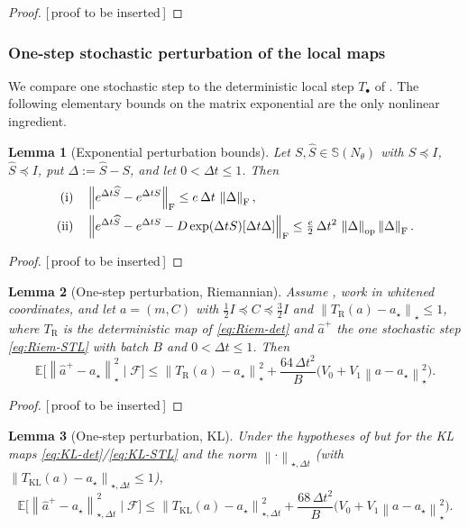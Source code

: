 \documentclass[11pt]{article}
\theoremstyle{plain}
\newtheorem{lemma}[lemma]{Lemma}
\theoremstyle{definition}
\theoremstyle{remark}
\newcommand{\E}{\mathbb{E}}
\newcommand{\KL}{\mathrm{KL}}
\newcommand{\Sym}{\mathbb{S}}
\newcommand{\Id}{I}
\newcommand{\op}{\mathrm{op}}
\newcommand{\Frob}{\mathrm{F}}
\newcommand{\Riem}{\mathrm{R}}
\newcommand{\Fil}{\mathcal{F}}
\newcommand{\norm}[1]{\left\lVert #1\right\rVert}
\newcommand{\PROOFHOLE}{{\color{red}\textsf{[\,proof to be inserted\,]}}}
\begin{document}
\begin{proof}
\PROOFHOLE
\end{proof}

\subsubsection{One-step stochastic perturbation of the local maps}
\label{subsec:local-perturb}

We compare one stochastic step to the deterministic local step $T_\bullet$ of .
The following elementary bounds on the matrix exponential are the only nonlinear ingredient.

\begin{lemma}[Exponential perturbation bounds]
\label{lem:exp-perturb}
Let $S,\widehat S\in\Sym(N_\theta)$ with $S\preceq\Id$, $\widehat S\preceq\Id$, put
$\Delta:=\widehat S-S$, and let $0<\Delta t\leq1$. Then
\begin{align*}
\textup{(i)}\quad & \norm{e^{\Delta t\widehat S}-e^{\Delta tS}}_{\Frob}\leq e\,\Delta t\,\norm{\Delta}_{\Frob},\\
\textup{(ii)}\quad & \norm{e^{\Delta t\widehat S}-e^{\Delta tS}-D\exp(\Delta tS)[\Delta t\Delta]}_{\Frob}
\leq\tfrac{e}{2}\,\Delta t^2\,\norm{\Delta}_{\op}\norm{\Delta}_{\Frob}.
\end{align*}
\end{lemma}

\begin{proof}
\PROOFHOLE
\end{proof}

\begin{lemma}[One-step perturbation, Riemannian]
\label{lem:local-perturb-Riem}
Assume , work in whitened coordinates, and let
$a=(m,C)$ with $\tfrac12\Id\preceq C\preceq\tfrac32\Id$ and $\norm{T_{\Riem}(a)-a_\star}_\star\leq1$,
where $T_{\Riem}$ is the deterministic map of \eqref{eq:Riem-det} and $\widehat a^+$ the one stochastic
step \eqref{eq:Riem-STL} with batch $B$ and $0<\Delta t\leq1$. Then
\[
    \E\bigl[\norm{\widehat a^+-a_\star}_\star^2\mid\Fil\bigr]
    \leq\norm{T_{\Riem}(a)-a_\star}_\star^2+\frac{64\,\Delta t^2}{B}\bigl(V_0+V_1\norm{a-a_\star}_\star^2\bigr).
\]
\end{lemma}

\begin{proof}
\PROOFHOLE
\end{proof}

\begin{lemma}[One-step perturbation, KL]
\label{lem:local-perturb-KL}
Under the hypotheses of  but for the KL maps
\eqref{eq:KL-det}/\eqref{eq:KL-STL} and the norm $\norm\cdot_{\star,\Delta t}$ (with
$\norm{T_{\KL}(a)-a_\star}_{\star,\Delta t}\leq1$),
\[
    \E\bigl[\norm{\widehat a^+-a_\star}_{\star,\Delta t}^2\mid\Fil\bigr]
    \leq\norm{T_{\KL}(a)-a_\star}_{\star,\Delta t}^2+\frac{68\,\Delta t^2}{B}\bigl(V_0+V_1\norm{a-a_\star}_\star^2\bigr).
\]
\end{lemma}
\end{document}
